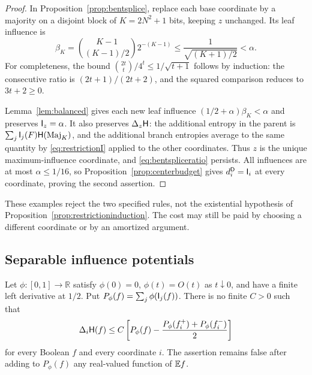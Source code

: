 \begin{proof}
In Proposition~\ref{prop:bentsplice}, replace each base coordinate
by a majority on a disjoint block of
$K=2N^2+1$ bits, keeping $z$ unchanged. Its leaf influence is
\[
 \beta_K=\binom{K-1}{(K-1)/2}2^{-(K-1)}
 \le\frac1{\sqrt{(K+1)/2}}<\alpha.
\]
For completeness, the bound
$\binom{2t}{t}/4^t\le1/\sqrt{t+1}$ follows by induction:
the consecutive ratio is $(2t+1)/(2t+2)$, and the squared
comparison reduces to $3t+2\ge0$.

Lemma~\ref{lem:balanced} gives each new leaf influence
$(1/2+\alpha)\beta_K<\alpha$ and preserves $\mathsf I_z=\alpha$.
It also preserves $\Delta_z\mathsf H$: the additional entropy
in the parent is $\sum_j\mathsf I_j(F)\mathsf H(\operatorname{Maj}_K)$, and the
additional branch entropies average to the same quantity
by \eqref{eq:restrictionI} applied to the other coordinates.
Thus $z$ is the unique maximum-influence coordinate, and
\eqref{eq:bentspliceratio} persists.
All influences are at most $\alpha\le1/16$, so
Proposition~\ref{prop:centerbudget} gives
$d_i^{\mathsf D}=\mathsf I_i$ at every coordinate, proving the second assertion.
\end{proof}

These examples reject the two specified rules, not the
existential hypothesis of Proposition~\ref{prop:restrictioninduction}.
The cost may still be paid by choosing a different coordinate
or by an amortized argument.

\subsection{Separable influence potentials}

\begin{proposition}\label{prop:separablepotential}
Let $\phi:[0,1]\to\mathbb R$ satisfy $\phi(0)=0$,
$\phi(t)=O(t)$ as $t\downarrow0$, and have a finite left derivative
at $1/2$. Put $P_\phi(f)=\sum_j\phi(\mathsf I_j(f))$.
There is no finite $C>0$ such that
\begin{equation}\label{eq:falsepotentialcharge}
 \Delta_i\mathsf H(f)\le C\left[
 P_\phi(f)-\frac{P_\phi(f_i^+)+P_\phi(f_i^-)}2\right]
\end{equation}
for every Boolean $f$ and every coordinate $i$.
The assertion remains false after adding to $P_\phi(f)$ any
real-valued function of $\mathbb E f$.
\end{proposition}

